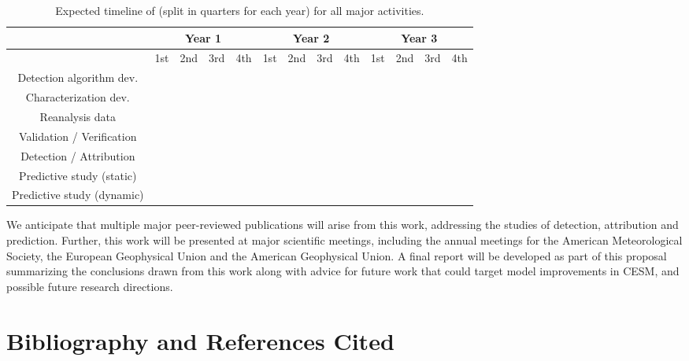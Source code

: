 \documentclass[11pt]{article}
\begin{document}
\begin{table}
\begin{tabular}{c||c|c|c|c||c|c|c|c||c|c|c|c|}
& \multicolumn{4}{c}{Year 1} & \multicolumn{4}{c}{Year 2} & \multicolumn{4}{c}{Year 3}  \\
  \hline
         & 1st & 2nd & 3rd & 4th & 1st & 2nd & 3rd & 4th  & 1st & 2nd & 3rd & 4th \\
\hline
\hline
Detection algorithm dev. & \cellcolor{red!35} & \cellcolor{red!35} & \cellcolor{red!35} & \cellcolor{red!35} & & & & & & & &  \\
\hline
Characterization dev. & \cellcolor{blue!35} & \cellcolor{blue!35} & \cellcolor{blue!35} & \cellcolor{blue!35} & & & & & & & &  \\
\hline
Reanalysis data  & \cellcolor{cyan!35} & \cellcolor{cyan!35} & \cellcolor{cyan!35} &  \cellcolor{cyan!35}  & \cellcolor{cyan!35} & \cellcolor{cyan!35} & & & & & & \\
\hline
Validation / Verification  & & & & & \cellcolor{red!35} & \cellcolor{red!35} & \cellcolor{red!35} &  \cellcolor{red!35}  & & & & \\
\hline
Detection / Attribution & & & & & \cellcolor{blue!35} & \cellcolor{blue!35} & \cellcolor{blue!35} &  \cellcolor{blue!35}  & \cellcolor{blue!35} & \cellcolor{blue!35} & & \\
\hline
Predictive study (static)  & & & & & & & \cellcolor{cyan!35} &  \cellcolor{cyan!35}  & \cellcolor{cyan!35} & \cellcolor{cyan!35} & \cellcolor{cyan!35} &  \cellcolor{cyan!35} \\
\hline
Predictive study (dynamic)  & & & & & & & & & \cellcolor{green!35} & \cellcolor{green!35} & \cellcolor{green!35} &  \cellcolor{green!35} \\
  \hline
\end{tabular}
\caption{Expected timeline of (split in quarters for each year) for all major activities.} \label{tab:ExpectedTimeline}
\end{table}

We anticipate that multiple major peer-reviewed publications will arise from this work, addressing the studies of detection, attribution and prediction. Further, this work will be presented at major scientific meetings, including the annual meetings for the American Meteorological Society, the European Geophysical Union and the American Geophysical Union.  A final report will be developed as part of this proposal summarizing the conclusions drawn from this work along with advice for future work that could target model improvements in CESM, and possible future research directions.

\section{Bibliography and References Cited}

\vspace{-1cm}



\clearpage
\end{document}
